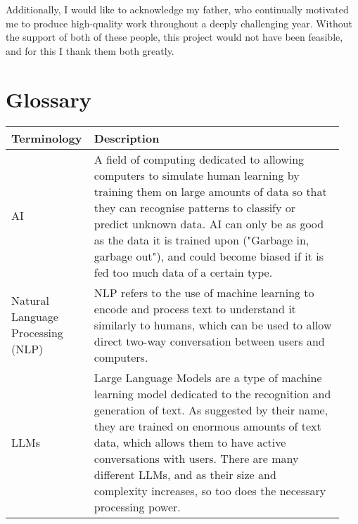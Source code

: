 \documentclass[12pt]{report}
\newcommand{\para}{\vspace{7pt}\noindent}
\begin{document}
\para Additionally, I would like to acknowledge my father, who continually motivated me to produce high-quality 
work throughout a deeply challenging year. Without the support of both of these people, this project 
would not have been feasible, and for this I thank them both greatly.


\chapter*{Glossary}
\thispagestyle{empty}
\begin{table}[H]
    \begin{tabular}{|p{0.2\linewidth}|p{0.74\linewidth}|}
        \hline
        \cellcolor{blue!25}Terminology & \cellcolor{blue!25}Description\\
        \hline 

        AI & A field of computing dedicated to allowing computers to simulate human
        learning by training them on large amounts of data so that they can recognise patterns to classify or 
        predict unknown data. AI can only be as good as the data it is trained upon ("Garbage in, garbage out"), and could
        become biased if it is fed too much data of a certain type.\\



        \hline

        Natural Language Processing \newline (NLP) & NLP refers to the use of machine learning to encode and 
        process text to understand it similarly to humans, which can be used to allow direct 
        two-way conversation between users and computers.\\

        \hline
        
        LLMs & Large Language Models are a type of machine learning model dedicated to the recognition and generation of text.
        As suggested by their name, they are trained on enormous amounts of text data, which allows them 
        to have active conversations with users. There are many different LLMs, and as their size and 
        complexity increases, so too does the necessary processing power. 
        \\
        \hline 


\end{tabular}
\end{table}
\end{document}
